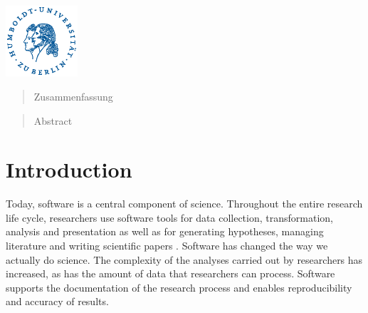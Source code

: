 \documentclass[12pt,a4paper,titlepage,oneside,abstract=true,toc=listof,toc=bibliography]{scrreprt}
\begin{document}
\begin{titlepage}
	\vfill\vfill
	\includegraphics[width=0.2\textwidth]{husiegel_bw_op.eps}\\[1cm] %
	 
	
	\vfill %
	
\end{titlepage}

\def\abstractname{Zusammenfassung}
\begin{abstract}
Zusammenfassung
\end{abstract}

\def\abstractname{Abstract}
\begin{abstract}
Abstract
\end{abstract}

\tableofcontents
\cleardoublepage
\listoffigures                        
\cleardoublepage
\listoftables
\cleardoublepage
{}
\cleardoublepage
\printnomenclature


\chapter{Introduction}
Today, software is a central component of science. Throughout the entire research life cycle, researchers use software tools for data collection, transformation, analysis and presentation as well as for generating hypotheses, managing literature and writing scientific papers \citep{Kethers2017, Pan2016, Wolski2017}. Software has changed the way we actually do science. The complexity of the analyses carried out by researchers has increased, as has the amount of data that researchers can process. Software supports the documentation of the research process and enables reproducibility \citep{DallmeierTiessen2016, Waltemath2016} and accuracy of results.
\end{document}

